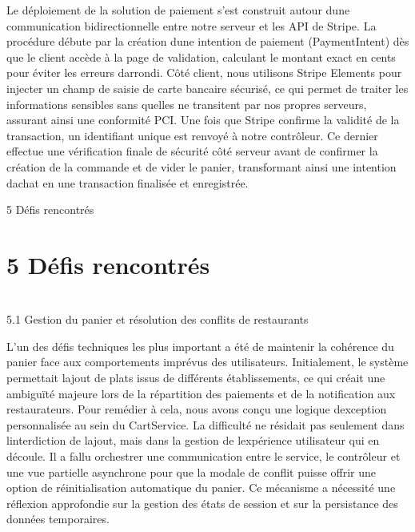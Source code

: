 \documentclass[
]{article}
\begin{document}
Le déploiement de la solution de paiement s'est construit autour
d\textquotesingle une communication bidirectionnelle entre notre serveur
et les API de Stripe. La procédure débute par la création
d\textquotesingle une intention de paiement (PaymentIntent) dès que le
client accède à la page de validation, calculant le montant exact en
cents pour éviter les erreurs d\textquotesingle arrondi. Côté client,
nous utilisons Stripe Elements pour injecter un champ de saisie de carte
bancaire sécurisé, ce qui permet de traiter les informations sensibles
sans qu\textquotesingle elles ne transitent par nos propres serveurs,
assurant ainsi une conformité PCI. Une fois que Stripe confirme la
validité de la transaction, un identifiant unique est renvoyé à notre
contrôleur. Ce dernier effectue une vérification finale de sécurité côté
serveur avant de confirmer la création de la commande et de vider le
panier, transformant ainsi une intention d\textquotesingle achat en une
transaction finalisée et enregistrée.

5 Défis rencontrés

\section{5 Défis rencontrés}\label{duxe9fis-rencontruxe9s}

\section{}\label{section-9}

5.1 Gestion du panier et résolution des conflits de restaurants

L'un des défis techniques les plus important a été de maintenir la
cohérence du panier face aux comportements imprévus des utilisateurs.
Initialement, le système permettait l\textquotesingle ajout de plats
issus de différents établissements, ce qui créait une ambiguïté majeure
lors de la répartition des paiements et de la notification aux
restaurateurs. Pour remédier à cela, nous avons conçu une logique
d\textquotesingle exception personnalisée au sein du CartService. La
difficulté ne résidait pas seulement dans l\textquotesingle interdiction
de l\textquotesingle ajout, mais dans la gestion de
l\textquotesingle expérience utilisateur qui en découle. Il a fallu
orchestrer une communication entre le service, le contrôleur et une vue
partielle asynchrone pour que la modale de conflit puisse offrir une
option de réinitialisation automatique du panier. Ce mécanisme a
nécessité une réflexion approfondie sur la gestion des états de session
et sur la persistance des données temporaires.
\end{document}
